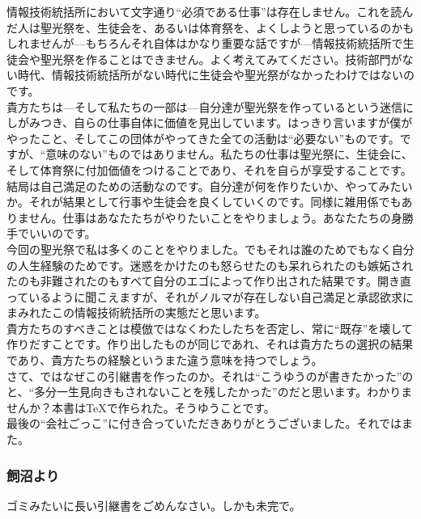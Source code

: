\documentclass[dvipdfmx,jb5]{jarticle}
\begin{document}
 情報技術統括所において文字通り``必須である仕事''は存在しません。これを読んだ人は聖光祭を、生徒会を、あるいは体育祭を、よくしようと思っているのかもしれませんが---もちろんそれ自体はかなり重要な話ですが---情報技術統括所で生徒会や聖光祭を作ることはできません。よく考えてみてください。技術部門がない時代、情報技術統括所がない時代に生徒会や聖光祭がなかったわけではないのです。
 \\

 貴方たちは---そして私たちの一部は---自分達が聖光祭を作っているという迷信にしがみつき、自らの仕事自体に価値を見出しています。はっきり言いますが僕がやったこと、そしてこの団体がやってきた全ての活動は``必要ない''ものです。ですが、``意味のない''ものではありません。私たちの仕事は聖光祭に、生徒会に、そして体育祭に付加価値をつけることであり、それを自らが享受することです。
 \\

 結局は自己満足のための活動なのです。自分達が何を作りたいか、やってみたいか。それが結果として行事や生徒会を良くしていくのです。同様に雑用係でもありません。仕事はあなたたちがやりたいことをやりましょう。あなたたちの身勝手でいいのです。
  \\
  
  今回の聖光祭で私は多くのことをやりました。でもそれは誰のためでもなく自分の人生経験のためです。迷惑をかけたのも怒らせたのも呆れられたのも嫉妬されたのも非難されたのもすべて自分のエゴによって作り出された結果です。開き直っているように聞こえますが、それがノルマが存在しない自己満足と承認欲求にまみれたこの情報技術統括所の実態だと思います。
  \\
  
 貴方たちのすべきことは模倣ではなくわたしたちを否定し、常に``既存''を壊して作りだすことです。作り出したものが同じであれ、それは貴方たちの選択の結果であり、貴方たちの経験というまた違う意味を持つでしょう。
 \\
 
 さて、ではなぜこの引継書を作ったのか。それは``こうゆうのが書きたかった''のと、``多分一生見向きもされないことを残したかった''のだと思います。わかりませんか？本書は\TeX で作られた。そうゆうことです。
 \\
 
 最後の``会社ごっこ''に付き合っていただきありがとうございました。それではまた。
\subsubsection{飼沼より}
ゴミみたいに長い引継書をごめんなさい。しかも未完で。
\\
\end{document}
